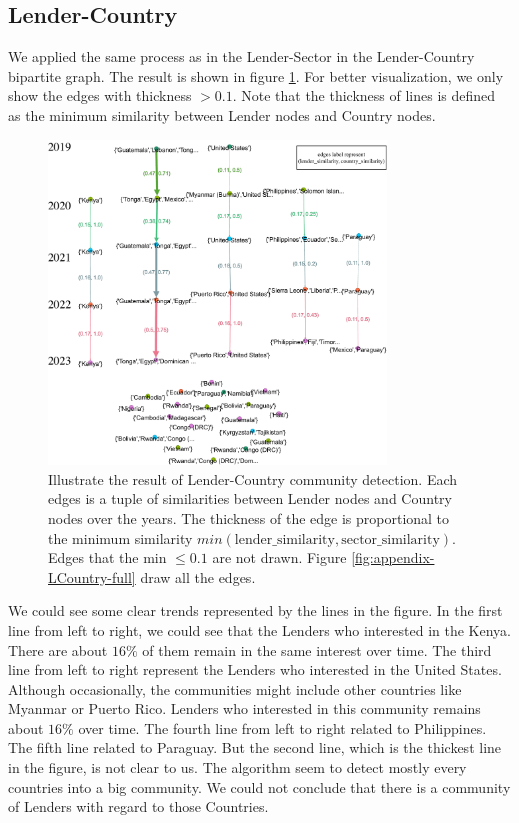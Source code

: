 \subsection{Lender-Country}

We applied the same process as in the Lender-Sector in the Lender-Country bipartite graph.
The result is shown in figure \ref{fig:LCountry}.
For better visualization, we only show the edges with thickness $> 0.1$.
Note that the thickness of lines is defined as the minimum similarity between Lender nodes and Country nodes.

\begin{figure}[H]
	\centering
	\includegraphics[width=0.8\textwidth]{images/LCountry.pdf}
	\caption[Illustrate the result of Lender-Country community detection]{
		Illustrate the result of Lender-Country community detection.
		Each edges is a tuple of similarities between Lender nodes and Country nodes over the years.
		The thickness of the edge is proportional to the minimum similarity $min(\text{lender\_similarity}, \text{sector\_similarity})$.
		Edges that the min $\le 0.1$ are not drawn.
		Figure \ref{fig:appendix-LCountry-full} draw all the edges.
	}
	\label{fig:LCountry}
\end{figure}

We could see some clear trends represented by the lines in the figure.
In the first line from left to right, we could see that the Lenders who interested in the Kenya.
There are about $16\%$ of them remain in the same interest over time.
The third line from left to right represent the Lenders who interested in the United States.
Although occasionally, the communities might include other countries like Myanmar or Puerto Rico.
Lenders who interested in this community remains about $16\%$ over time.
The fourth line from left to right related to Philippines.
The fifth line related to Paraguay.
But the second line, which is the thickest line in the figure, is not clear to us.
The algorithm seem to detect mostly every countries into a big community.
We could not conclude that there is a community of Lenders with regard to those Countries.

